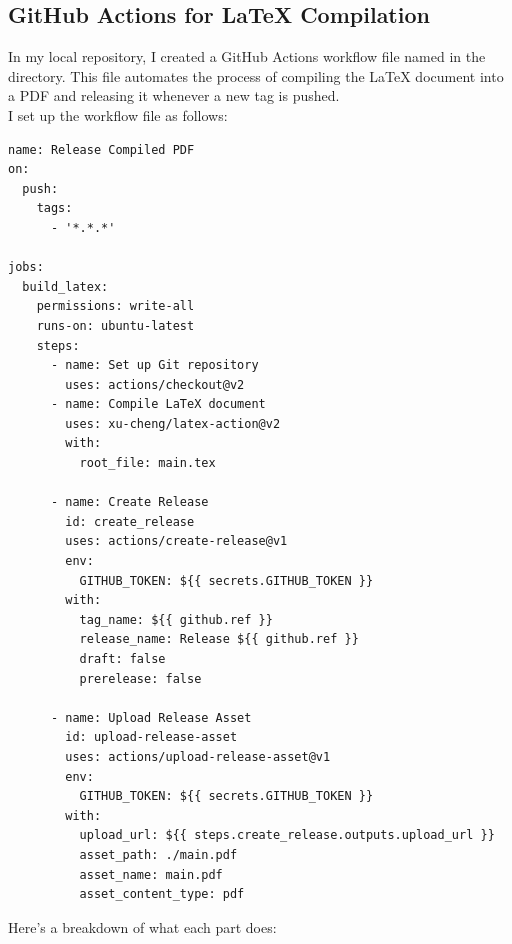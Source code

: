\documentclass[titlepage]{article}
\begin{document}
\subsection{GitHub Actions for \LaTeX \hspace{0pt} Compilation}
In my local repository, I created a GitHub Actions workflow file named  in the  directory. This file automates the process of compiling the \LaTeX \hspace{0pt} document into a PDF and releasing it whenever a new tag is pushed. 
\vspace{5pt}
\\I set up the workflow file as follows:
\begin{tcolorbox}[codebox]
\begin{lstlisting}
name: Release Compiled PDF 
on:
  push:
    tags:
      - '*.*.*'

jobs:
  build_latex:
    permissions: write-all
    runs-on: ubuntu-latest
    steps:
      - name: Set up Git repository
        uses: actions/checkout@v2
      - name: Compile LaTeX document
        uses: xu-cheng/latex-action@v2
        with:
          root_file: main.tex

      - name: Create Release
        id: create_release
        uses: actions/create-release@v1
        env:
          GITHUB_TOKEN: ${{ secrets.GITHUB_TOKEN }}
        with:
          tag_name: ${{ github.ref }}
          release_name: Release ${{ github.ref }}
          draft: false
          prerelease: false

      - name: Upload Release Asset
        id: upload-release-asset 
        uses: actions/upload-release-asset@v1
        env:
          GITHUB_TOKEN: ${{ secrets.GITHUB_TOKEN }}
        with:
          upload_url: ${{ steps.create_release.outputs.upload_url }} 
          asset_path: ./main.pdf
          asset_name: main.pdf
          asset_content_type: pdf
\end{lstlisting}  
\end{tcolorbox}
\vspace{5pt}
\noindent Here's a breakdown of what each part does:
\end{document}
